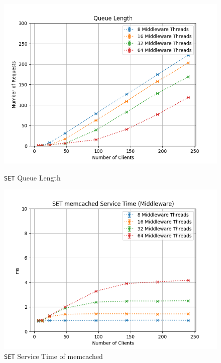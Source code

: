\documentclass[11pt,a4paper]{article}
\begin{document}
\begin{figure}[H]
	\centering
	\captionsetup{width=0.4\textwidth}
    \begin{minipage}{0.5\textwidth}
        \includegraphics[width=\textwidth]{../illustrations/plots/2_1_one_middleware/1-0/middleware_queue_length.png}
        \caption{\texttt{SET} Queue Length}
        \label{fig:one_middleware_set_ql}
    \end{minipage}\hfill
    \begin{minipage}{0.5\textwidth}
        \centering
        \includegraphics[width=\textwidth]{../illustrations/plots/2_1_one_middleware/1-0/middleware_set_service_time_ms.png}
        \caption{\texttt{SET} Service Time of memcached}
        \label{fig:one_middleware_set_st_mw}
    \end{minipage}
\end{figure}
\end{document}

